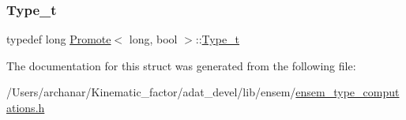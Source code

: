 \subsubsection{\texorpdfstring{Type\_t}{Type\_t}\hspace{0.1cm}{\footnotesize\ttfamily [2/2]}}
{\footnotesize\ttfamily typedef long \mbox{\hyperlink{structPromote}{Promote}}$<$ long, bool $>$\+::\mbox{\hyperlink{structPromote_3_01long_00_01bool_01_4_a925cd3195392464ce3df63fdd86c02bd}{Type\+\_\+t}}}



The documentation for this struct was generated from the following file\+:\begin{DoxyCompactItemize}
\item 
/\+Users/archanar/\+Kinematic\+\_\+factor/adat\+\_\+devel/lib/ensem/\mbox{\hyperlink{lib_2ensem_2ensem__type__computations_8h}{ensem\+\_\+type\+\_\+computations.\+h}}\end{DoxyCompactItemize}
